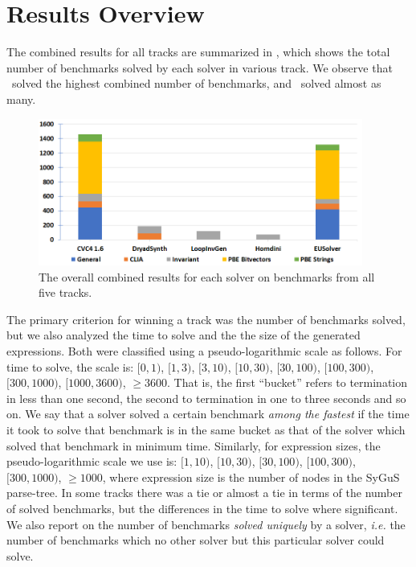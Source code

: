 \section{Results Overview}
\label{sec:comp-results}

The combined results for all tracks are summarized in ,
which shows the total number of benchmarks solved by each solver in various track.
We observe that \cvcnew\ solved the highest combined number of benchmarks,
and \eusolvernew\ solved almost as many.

\begin{figure}
	\centering
	\includegraphics[width=0.95\textwidth]{figures/TotalSolved.png}
	\caption{The overall combined results for each solver on benchmarks from all five tracks.}
	\label{fig:combinedresults}
\end{figure}

The primary criterion for winning a track was the number of benchmarks solved,
but we also analyzed the time to solve and the the size of the generated expressions.
Both were classified using a pseudo-logarithmic scale as follows.
For time to solve, the scale is: $[0,1)$, $[1,3)$, $[3,10)$, $[10,30)$, $[30, 100)$,
$[100,300)$, $[300, 1000)$, $[1000,3600)$, $\geqslant 3600$.
That is, the first ``bucket'' refers to termination in less than one second,
the second to termination in one to three seconds and so on.
We say that a solver solved a certain benchmark \emph{among the fastest}
if the time it took to solve that benchmark is in the same bucket
as that of the solver which solved that benchmark in minimum time.
Similarly, for expression sizes, the pseudo-logarithmic scale we use is:
$[1,10)$, $[10,30)$, $[30,100)$, $[100,300)$, $[300,1000)$, $\geqslant 1000$,
where expression size is the number of nodes in the SyGuS parse-tree.
In some tracks there was a tie or almost a tie in terms of the number of solved benchmarks,
but the differences in the time to solve where significant.
We also report on the number of benchmarks \emph{solved uniquely} by a solver,
\emph{i.e.} the number of benchmarks which no other solver but this particular solver could solve.


